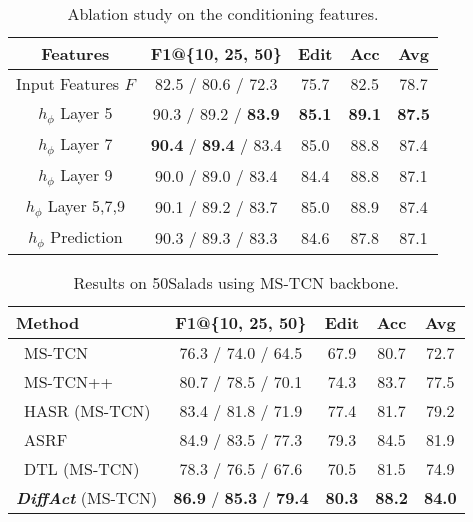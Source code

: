 \documentclass[10pt,twocolumn,letterpaper]{article}
\begin{document}
\begin{table}[t]
\begin{center}
\footnotesize
\begin{tabular}{c | c c c c c c}
\hline
 Features & \multicolumn{3}{c}{F1@\{10, 25, 50\}} & Edit & Acc & Avg\\
\hline
Input Features $F$ & \multicolumn{3}{c}{ 82.5 / 80.6 / 72.3 } & 75.7 & 82.5 & 78.7 \\ 
$h_\phi$ Layer 5 & \multicolumn{3}{c}{ 90.3 / 89.2 / \textbf{83.9} } & \textbf{85.1} & \textbf{89.1} & \textbf{87.5} \\ 
$h_\phi$ Layer 7 & \multicolumn{3}{c}{ \textbf{90.4} / \textbf{89.4} / 83.4 } & 85.0 & 88.8 & 87.4 \\ 
$h_\phi$ Layer 9 & \multicolumn{3}{c}{ 90.0 / 89.0 / 83.4 } & 84.4 & 88.8 & 87.1 \\ 
$h_\phi$ Layer 5,7,9 & \multicolumn{3}{c}{ 90.1 / 89.2 / 83.7 } & 85.0 & 88.9 & 87.4 \\ 
$h_\phi$ Prediction & \multicolumn{3}{c}{ 90.3 / 89.3 / 83.3 } & 84.6 & 87.8 & 87.1 \\ 
\hline
\end{tabular}
\end{center}
\caption{Ablation study on the conditioning features.} 
\label{table:ablation-feature}
\end{table}

\begin{table}[t]
\begin{center}
\footnotesize
\begin{tabular}{l | c c c c c c }
\hline
 Method & \multicolumn{3}{c}{F1@\{10, 25, 50\}} & Edit & Acc & Avg\\
\hline
~\cite{2019_CVPR_Farha}MS-TCN & \multicolumn{3}{c}{76.3 / 74.0 / 64.5} & 67.9 & 80.7 & 72.7\\
~\cite{2020_PAMI_Li}MS-TCN++ & \multicolumn{3}{c}{80.7 / 78.5 / 70.1} & 74.3 & 83.7 & 77.5\\
~\cite{2021_ICCV_Ahn}HASR (MS-TCN) & \multicolumn{3}{c}{83.4 / 81.8 / 71.9} & 77.4 & 81.7 & 79.2\\
~\cite{2021_WACV_Ishikawa}ASRF & \multicolumn{3}{c}{84.9 / 83.5 / 77.3} & 79.3 & 84.5 & 81.9\\
~\cite{2022_NeurIPS_Xu}DTL (MS-TCN) & \multicolumn{3}{c}{78.3 / 76.5 / 67.6} & 70.5 & 81.5 & 74.9\\
\hline
\textbf{\textit{DiffAct}} (MS-TCN) & \multicolumn{3}{c}{ \textbf{86.9} / \textbf{85.3} / \textbf{79.4} } & \textbf{80.3} & \textbf{88.2} & \textbf{84.0} \\
\hline
\end{tabular}
\end{center}
\caption{Results on 50Salads using MS-TCN backbone.} 
\label{table:mstcn}
\end{table}
\end{document}
